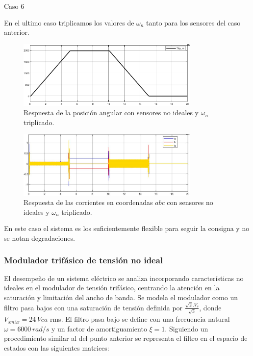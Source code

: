 \documentclass{article}
\begin{document}
\bullet Caso 6

En el ultimo caso triplicamos los valores de $\omega_n$ tanto para los sensores del caso anterior.

\begin{figure}[H]
    \centering
    \includegraphics[width=0.8\textwidth]{5.2.5.d.7.png}
    \caption{Respuesta de la posición angular con sensores no ideales y $\omega_n$ triplicado.}
\end{figure}

\begin{figure}[H]
    \centering
    \includegraphics[width=0.8\textwidth]{5.2.5.d.8.png}
    \caption{Respuesta de las corrientes en coordenadas $abc$ con sensores no ideales y $\omega_n$ triplicado.}
\end{figure}

En este caso el sistema es los suficientemente flexible para seguir la consigna y no se notan degradaciones.


\subsubsection{Modulador trifásico de tensión no ideal}

El desempeño de un sistema eléctrico se analiza incorporando características no ideales en el 
modulador de tensión trifásico, centrando la atención en la saturación y limitación del ancho de 
banda. Se modela el modulador como un filtro pasa bajos con una saturación de tensión definida por 
$\frac{\sqrt{2}.V_s}{\sqrt{3}}$, donde $V_{smáx} = 24\,Vca$ rms. El filtro pasa bajo se define con 
una frecuencia natural $\omega = 6000\,rad/s$ y un factor de amortiguamiento $\xi = 1$. Siguiendo un
procedimiento similar al del punto anterior se representa el filtro en el espacio de estados con 
las siguientes matrices: 
\end{document}
